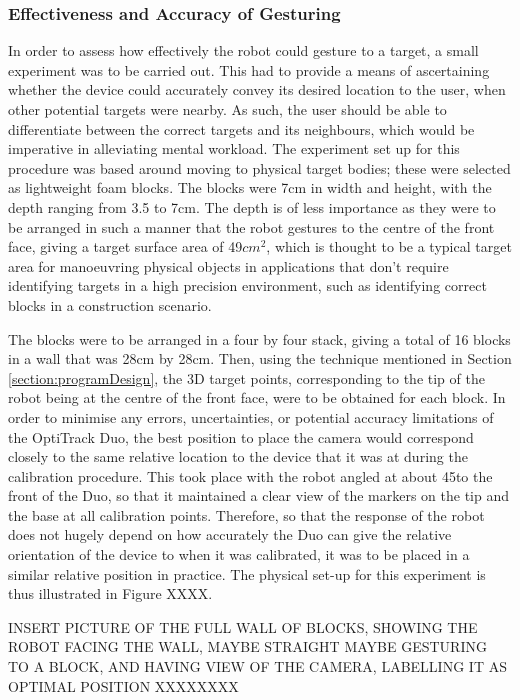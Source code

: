 \documentclass[11pt]{article}
\begin{document}
\subsubsection{Effectiveness and Accuracy of Gesturing}

In order to assess how effectively the robot could gesture to a target, a small experiment was to be carried out. This had to provide a means of ascertaining whether the device could accurately convey its desired location to the user, when other potential targets were nearby. As such, the user should be able to differentiate between the correct targets and its neighbours, which would be imperative in alleviating mental workload. The experiment set up for this procedure was based around moving to physical target bodies; these were selected as lightweight foam blocks. The blocks were 7cm in width and height, with the depth ranging from 3.5 to 7cm. The depth is of less importance as they were to be arranged in such a manner that the robot gestures to the centre of the front face, giving a target surface area of 49$cm^{2}$, which is thought to be a typical target area for manoeuvring physical objects in applications that don't require identifying targets in a high precision environment, such as identifying correct blocks in a construction scenario.

The blocks were to be arranged in a four by four stack, giving a total of 16 blocks in a wall that was 28cm by 28cm. Then, using the technique mentioned in Section \ref{section:programDesign}, the 3D target points, corresponding to the tip of the robot being at the centre of the front face, were to be obtained for each block. In order to minimise any errors, uncertainties, or potential accuracy limitations of the OptiTrack Duo, the best position to place the camera would correspond closely to the same relative location to the device that it was at during the calibration procedure. This took place with the robot angled at about 45\degree to the front of the Duo, so that it maintained a clear view of the markers on the tip and the base at all calibration points. Therefore, so that the response of the robot does not hugely depend on how accurately the Duo can give the relative orientation of the device to when it was calibrated, it was to be placed in a similar relative position in practice. The physical set-up for this experiment is thus illustrated in Figure XXXX.


INSERT PICTURE OF THE FULL WALL OF BLOCKS, SHOWING THE ROBOT FACING THE WALL, MAYBE STRAIGHT MAYBE GESTURING TO A BLOCK, AND HAVING VIEW OF THE CAMERA, LABELLING IT AS OPTIMAL POSITION XXXXXXXX
\end{document}
